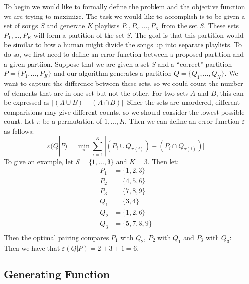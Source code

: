 \documentclass[12pt]{article}
\begin{document}
To begin we would like to formally define the problem and the objective function we are trying to maximize. The task we would like to accomplish is to be given a set of songs $S$ and generate $K$ playlists $P_1, P_2, \ldots, P_K$ from the set $S$. These sets $P_1, \ldots, P_K$ will form a partition of the set $S$. The goal is that this partition would be similar to how a human might divide the songs up into separate playlists. To do so, we first need to define an error function between a proposed partition and a given partiion. Suppose that we are given a set $S$ and a ``correct'' partition $P = \{P_1, \ldots, P_K\}$ and our algorithm generates a partition $Q = \{Q_1, \ldots, Q_K\}$. We want to capture the difference between these sets, so we could count the number of elements that are in one set but not the other. For two sets $A$ and $B$, this can be expressed as $|(A \cup B) - (A \cap B)|$. Since the sets are unordered, different comparisions may give different counts, so we should consider the lowest possible count. Let $\pi$ be a permutation of $1, \ldots, K$. Then we can define an error function $\varepsilon$ as follows:
$$
\varepsilon(Q | P) = \min_\pi \sum_{i=1}^K |(P_i \cup Q_{\pi(i)}) - (P_i \cap Q_{\pi(i)})|
$$
To give an example, let $S = \{1, \ldots, 9\}$ and $K = 3$. Then let:
\begin{align*}
  P_1 &= \{1, 2, 3\}\\
  P_2 &= \{4, 5, 6\}\\
  P_3 &= \{7, 8, 9\}\\
  Q_1 &= \{3, 4\}\\
  Q_2 &= \{1, 2, 6\}\\
  Q_3 &= \{5, 7, 8, 9\}\\
\end{align*}
Then the optimal pairing compares $P_1$ with $Q_2$, $P_2$ with $Q_1$ and $P_3$ with $Q_3$: Then we have that $\varepsilon(Q | P) = 2 + 3 + 1 = 6$.

\subsection*{Generating Function}
\end{document}
